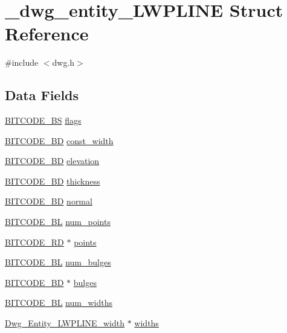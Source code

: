 \hypertarget{struct__dwg__entity__LWPLINE}{\section{\-\_\-dwg\-\_\-entity\-\_\-\-L\-W\-P\-L\-I\-N\-E \-Struct \-Reference}
\label{struct__dwg__entity__LWPLINE}
}


{\ttfamily \#include $<$dwg.\-h$>$}

\subsection*{\-Data \-Fields}
\begin{DoxyCompactItemize}
\item 
\hyperlink{dwg_8h_a94297606fbd4a4ff97e8add284af0809}{\-B\-I\-T\-C\-O\-D\-E\-\_\-\-B\-S} \hyperlink{struct__dwg__entity__LWPLINE_a35dde31776e6fad92e7b292e2e633416}{flags}
\item 
\hyperlink{dwg_8h_a3c1e6781466b74ba07785d57da70ed97}{\-B\-I\-T\-C\-O\-D\-E\-\_\-\-B\-D} \hyperlink{struct__dwg__entity__LWPLINE_a9a731985f371b93e3cd6ee7f7e99b459}{const\-\_\-width}
\item 
\hyperlink{dwg_8h_a3c1e6781466b74ba07785d57da70ed97}{\-B\-I\-T\-C\-O\-D\-E\-\_\-\-B\-D} \hyperlink{struct__dwg__entity__LWPLINE_a1f0b61d13f8062da1f90f1b2bf694c74}{elevation}
\item 
\hyperlink{dwg_8h_a3c1e6781466b74ba07785d57da70ed97}{\-B\-I\-T\-C\-O\-D\-E\-\_\-\-B\-D} \hyperlink{struct__dwg__entity__LWPLINE_a429d3ce64a992bb251a544fe4d668758}{thickness}
\item 
\hyperlink{dwg_8h_a00698ef1bb072aa0a9360c6fc1c57587}{\-B\-I\-T\-C\-O\-D\-E\-\_\-B\-D} \hyperlink{struct__dwg__entity__LWPLINE_a5adf89997d607d90a531380d30c394ac}{normal}
\item 
\hyperlink{dwg_8h_aebd5f127038868cbabc3d55d91da776c}{\-B\-I\-T\-C\-O\-D\-E\-\_\-\-B\-L} \hyperlink{struct__dwg__entity__LWPLINE_a2126fd8bbdf905e3836b78c816f58237}{num\-\_\-points}
\item 
\hyperlink{dwg_8h_a1d23a9bc9a02453876b244dc6706f6a6}{\-B\-I\-T\-C\-O\-D\-E\-\_\-R\-D} $\ast$ \hyperlink{struct__dwg__entity__LWPLINE_a021ca945fc6fb2a426741ca3b3eed2c4}{points}
\item 
\hyperlink{dwg_8h_aebd5f127038868cbabc3d55d91da776c}{\-B\-I\-T\-C\-O\-D\-E\-\_\-\-B\-L} \hyperlink{struct__dwg__entity__LWPLINE_a02e3e46c6e52bcde692a09620dc7aadc}{num\-\_\-bulges}
\item 
\hyperlink{dwg_8h_a3c1e6781466b74ba07785d57da70ed97}{\-B\-I\-T\-C\-O\-D\-E\-\_\-\-B\-D} $\ast$ \hyperlink{struct__dwg__entity__LWPLINE_a5a9cd95b6f1d1c17c5f4878d0e19a2f3}{bulges}
\item 
\hyperlink{dwg_8h_aebd5f127038868cbabc3d55d91da776c}{\-B\-I\-T\-C\-O\-D\-E\-\_\-\-B\-L} \hyperlink{struct__dwg__entity__LWPLINE_af86646601934a1d10a9f7d7bda6fa477}{num\-\_\-widths}
\item 
\hyperlink{dwg_8h_a1b6fa390ca4a6a8a8b245ca01ba82d16}{\-Dwg\-\_\-\-Entity\-\_\-\-L\-W\-P\-L\-I\-N\-E\-\_\-width} $\ast$ \hyperlink{struct__dwg__entity__LWPLINE_a637f66a9543e8b3f71dd9fff2cbe4560}{widths}
\end{DoxyCompactItemize}


